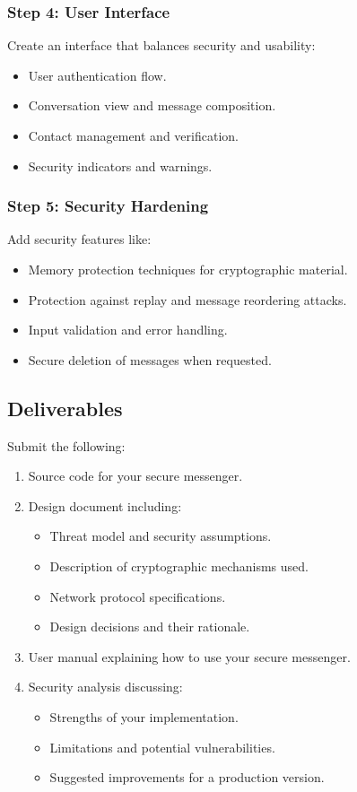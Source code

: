 \documentclass[10pt,a4paper,american]{article}
\begin{document}
\subsubsection*{Step 4: User Interface}
Create an interface that balances security and usability:
\begin{itemize}
	\item User authentication flow.
	\item Conversation view and message composition.
	\item Contact management and verification.
	\item Security indicators and warnings.
\end{itemize}

\subsubsection*{Step 5: Security Hardening}
Add security features like:
\begin{itemize}
	\item Memory protection techniques for cryptographic material.
	\item Protection against replay and message reordering attacks.
	\item Input validation and error handling.
	\item Secure deletion of messages when requested.
\end{itemize}

\subsection*{Deliverables}
Submit the following:

\begin{enumerate}
	\item Source code for your secure messenger.
	\item Design document including:
	      \begin{itemize}
		      \item Threat model and security assumptions.
		      \item Description of cryptographic mechanisms used.
		      \item Network protocol specifications.
		      \item Design decisions and their rationale.
	      \end{itemize}
	\item User manual explaining how to use your secure messenger.
	\item Security analysis discussing:
	      \begin{itemize}
		      \item Strengths of your implementation.
		      \item Limitations and potential vulnerabilities.
		      \item Suggested improvements for a production version.
	      \end{itemize}
\end{enumerate}
\end{document}
